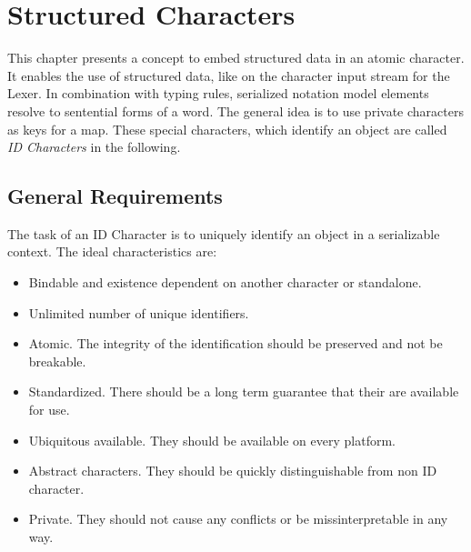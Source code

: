 \section{Structured Characters}
This chapter presents a concept to embed structured data in an atomic character. It enables the use of structured data, like  on the character input stream for the Lexer. In combination with typing rules, serialized notation model elements resolve to sentential forms of a word. The general idea is to use private characters as keys for a map. These special characters, which identify an object are called \emph{ID Characters} in the following.

\subsection{General Requirements}
The task of an ID Character is to uniquely identify an object in a serializable context. 
The ideal characteristics are:
\begin{itemize}
	\item Bindable and existence dependent on another character or standalone.
	\item Unlimited number of unique identifiers.
	\item Atomic. The integrity of the identification should be preserved and not be breakable.
	\item Standardized. There should be a long term guarantee that their are available for use.
	\item Ubiquitous available. They should be available on every platform.
	\item Abstract characters. They should be quickly distinguishable from non ID character.
	\item Private. They should not cause any conflicts or be missinterpretable in any way.
\end{itemize}

